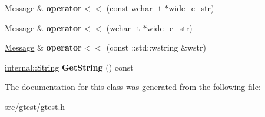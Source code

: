 \begin{DoxyCompactItemize}
\mbox{\hyperlink{classtesting_1_1_message}{Message}} \& {\bfseries operator$<$$<$} (const wchar\+\_\+t $\ast$wide\+\_\+c\+\_\+str)
\item 
\mbox{\label{classtesting_1_1_message_aae57eefb3a72a19c11453d630b1d846c}} 
\mbox{\hyperlink{classtesting_1_1_message}{Message}} \& {\bfseries operator$<$$<$} (wchar\+\_\+t $\ast$wide\+\_\+c\+\_\+str)
\item 
\mbox{\label{classtesting_1_1_message_a0feb54e52c1c27786ad67e93d4356774}} 
\mbox{\hyperlink{classtesting_1_1_message}{Message}} \& {\bfseries operator$<$$<$} (const \+::std\+::wstring \&wstr)
\item 
\mbox{\label{classtesting_1_1_message_acd7b70c6046eeafffd59f6df54c74107}} 
\mbox{\hyperlink{classtesting_1_1internal_1_1_string}{internal\+::\+String}} {\bfseries Get\+String} () const
\end{DoxyCompactItemize}


The documentation for this class was generated from the following file\+:\begin{DoxyCompactItemize}
\item 
src/gtest/gtest.\+h\end{DoxyCompactItemize}
